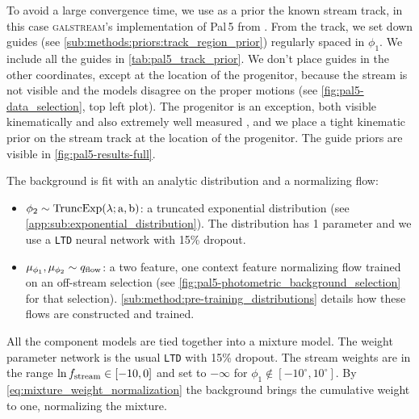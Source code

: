 \documentclass[twocolumn]{aastex631}
\newcommand{\code}[1]{\textsc{#1}}
\newcommand{\package}[1]{\code{#1}}
\newcommand{\stream}[1]{#1}
\begin{document}
        To avoid a large convergence time, we use as a prior the known stream
        track, in this case \package{galstream}'s \citep{Mateu2022}
        implementation of \stream{Pal\,5} from \citet{Ibata+2021}. From the
        track, we set down guides (see
        \autoref{sub:methods:priors:track_region_prior}) regularly spaced in
        $\phi_1$. We include all the guides in \autoref{tab:pal5_track_prior}.
        We don't place guides in the other coordinates, except at the location
        of the progenitor, because the stream is not visible and the models
        disagree on the proper motions (see \autoref{fig:pal5-data_selection},
        top left plot).  The progenitor is an exception, both visible
        kinematically and also extremely well measured
        \citep{VasilievBaumgardt2021}, and we place a tight kinematic prior on
        the stream track at the location of the progenitor.  The guide priors
        are visible in \autoref{fig:pal5-results-full}.

        The background is fit with an analytic distribution and a normalizing
        flow:
        \begin{itemize}
            \setlength\itemsep{0em}
            \item $\phi_2 \sim \rm{TruncExp}(\lambda; a, b)$: a truncated
                exponential distribution (see
                \autoref{app:sub:exponential_distribution}).  The distribution
                has 1 parameter and we use a \texttt{LTD} neural network with
                15\% dropout.
            \item $\mu_{\phi_1}, \mu_{\phi_2} \sim q_{\rm flow}$: a two feature,
                one context feature normalizing flow trained on an off-stream
                selection (see
                \autoref{fig:pal5-photometric_background_selection} for that
                selection). \autoref{sub:method:pre-training_distributions}
                details how these flows are constructed and trained.
        \end{itemize}

        All the component models are tied together into a mixture model.  The
        weight parameter network is the usual \texttt{LTD} with 15\% dropout.
        The stream weights are in the range $\ln{f_{\rm stream}} \in [-10, 0]$
        and set to $-\infty$ for $\phi_1 \notin [-10^\circ, 10^\circ]$. By
        \autoref{eq:mixture_weight_normalization} the background  brings the
        cumulative weight to one, normalizing the mixture.
\end{document}

